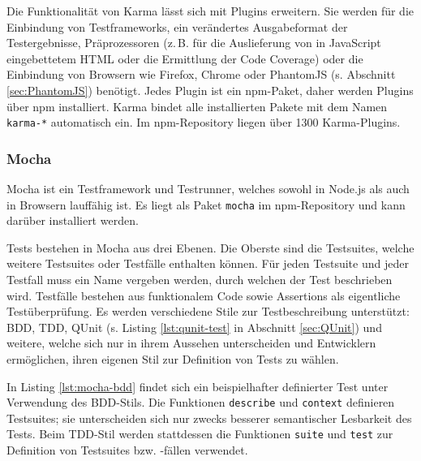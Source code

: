 \begin{figure}[H]
	
\end{figure}

Die Funktionalität von Karma lässt sich mit Plugins erweitern. Sie werden für die Einbindung von Testframeworks, ein verändertes Ausgabeformat der Testergebnisse, Präprozessoren (z.\,B. für die Auslieferung von in JavaScript eingebettetem HTML oder die Ermittlung der Code Coverage)\cite{karma-preprocessors} oder die Einbindung von Browsern wie Firefox, Chrome oder PhantomJS (s. Abschnitt \ref{sec:PhantomJS}) benötigt. Jedes Plugin ist ein npm-Paket, daher werden Plugins über npm installiert. Karma bindet alle installierten Pakete mit dem Namen \texttt{karma-*} automatisch ein.\cite{karma-plugins} Im npm-Repository liegen über 1300 Karma-Plugins.\cite{karma-npm}

\subsubsection{Mocha}
\label{sec:Mocha}
Mocha ist ein Testframework und Testrunner, welches sowohl in Node.js als auch in Browsern lauffähig ist. Es liegt als Paket \texttt{mocha} im npm-Repository und kann darüber installiert werden.\cite{mocha-index}

Tests bestehen in Mocha aus drei Ebenen. Die Oberste sind die Testsuites, welche weitere Testsuites oder Testfälle enthalten können. Für jeden Testsuite und jeder Testfall muss ein Name vergeben werden, durch welchen der Test beschrieben wird. Testfälle bestehen aus funktionalem Code sowie Assertions als eigentliche Testüberprüfung. Es werden verschiedene Stile zur Testbeschreibung unterstützt: BDD, TDD, QUnit (s. Listing \ref{lst:qunit-test} in Abschnitt \ref{sec:QUnit}) und weitere, welche sich nur in ihrem Aussehen unterscheiden und Entwicklern ermöglichen, ihren eigenen Stil zur Definition von Tests zu wählen.\cite{mocha-index}

\begin{figure}[H]
	
\end{figure}

In Listing \ref{lst:mocha-bdd} findet sich ein beispielhafter definierter Test unter Verwendung des BDD-Stils. Die Funktionen \texttt{describe} und \texttt{context} definieren Testsuites; sie unterscheiden sich nur zwecks besserer semantischer Lesbarkeit des Tests. Beim TDD-Stil werden stattdessen die Funktionen \texttt{suite} und \texttt{test} zur Definition von Testsuites bzw. -fällen verwendet.\cite{mocha-index}

